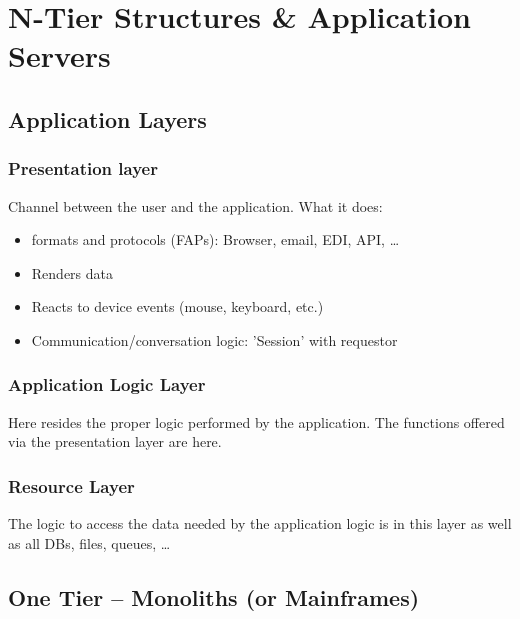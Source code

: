 \chapter{N-Tier Structures \& Application Servers}
	\section{Application Layers}
		\subsection{Presentation layer}
			Channel between the user and the application. What it does:
			\begin{itemize}
				\item formats and protocols (FAPs): Browser, email, EDI, API, \ldots
				\item Renders data
				\item Reacts to device events (mouse, keyboard, etc.)
				\item Communication/conversation logic: 'Session' with requestor
			\end{itemize}
		
		\subsection{Application Logic Layer}
			Here resides the proper logic performed by the application. The functions offered via the presentation layer are here.
			
		\subsection{Resource Layer}
			The logic to access the data needed by the application logic is in this layer as well as all DBs, files, queues, \ldots
		
		
		
	\section{One Tier -- Monoliths (or Mainframes)}
		
		